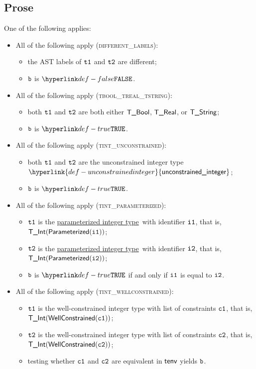 \documentclass{book}
\newcommand\ProseOrTypeError[0]{\ProseTerminateAs{\TypeErrorConfig}}
\newcommand\unconstrainedinteger[0]{\hyperlink{def-unconstrainedinteger}{\textsf{unconstrained\_integer}}}
\newcommand\parameterizedintegertype[0]{\hyperlink{def-parameterizedintegertype}{parameterized integer type}}
\begin{document}
\subsection{Prose}
One of the following applies:
\begin{itemize}
  \item All of the following apply (\textsc{different\_labels}):
  \begin{itemize}
    \item the AST labels of $\texttt{t1}$ and $\texttt{t2}$ are different;
    \item $\texttt{b}$ is $\False$.
  \end{itemize}

  \item All of the following apply (\textsc{tbool\_treal\_tstring}):
  \begin{itemize}
    \item both $\texttt{t1}$ and $\texttt{t2}$ are both either $\textsf{T\_Bool}$, $\textsf{T\_Real}$, or $\textsf{T\_String}$;
    \item $\texttt{b}$ is $\True$.
  \end{itemize}

  \item All of the following apply (\textsc{tint\_unconstrained}):
  \begin{itemize}
    \item both $\texttt{t1}$ and $\texttt{t2}$ are the unconstrained integer type $\unconstrainedinteger$;
    \item $\texttt{b}$ is $\True$.
  \end{itemize}

  \item All of the following apply (\textsc{tint\_parameterized}):
  \begin{itemize}
    \item $\texttt{t1}$ is the \parameterizedintegertype\  with identifier $\texttt{i1}$, that is, \\ $\textsf{T\_Int}(\textsf{Parameterized}(\texttt{i1}))$;
    \item $\texttt{t2}$ is the \parameterizedintegertype\ with identifier $\texttt{i2}$, that is, \\ $\textsf{T\_Int}(\textsf{Parameterized}(\texttt{i2}))$;
    \item $\texttt{b}$ is $\True$ if and only if $\texttt{i1}$ is equal to $\texttt{i2}$.
  \end{itemize}

  \item All of the following apply (\textsc{tint\_wellconstrained}):
  \begin{itemize}
    \item $\texttt{t1}$ is the well-constrained integer type with list of constraints $\texttt{c1}$, that is, \\ $\textsf{T\_Int}(\textsf{WellConstrained}(\texttt{c1}))$;
    \item $\texttt{t2}$ is the well-constrained integer type with list of constraints $\texttt{c2}$, that is, \\ $\textsf{T\_Int}(\textsf{WellConstrained}(\texttt{c2}))$;
    \item testing whether $\texttt{c1}$ and $\texttt{c2}$ are equivalent in $\textsf{tenv}$ yields $\texttt{b}$\ProseOrTypeError.
  \end{itemize}


\end{itemize}
\end{document}
